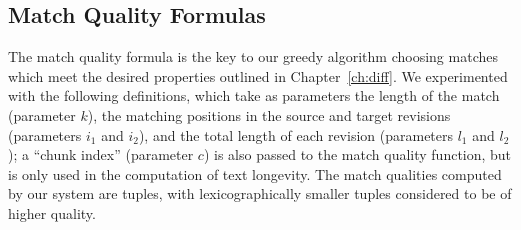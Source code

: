 \subsection{Match Quality Formulas}

The match quality formula is the key to our greedy algorithm
choosing matches which meet the desired properties outlined
in Chapter~\ref{ch:diff}.
We experimented with the following  definitions,
which take as parameters the length of the match (parameter $k$),
the matching positions in the source and target revisions
(parameters $i_1$ and $i_2$), and the total length of
each revision (parameters $l_1$ and $l_2$);
a ``chunk index'' (parameter $c$) is also passed to the
match quality function, but is only used in the computation
of text longevity.
The match qualities computed by our system are tuples,
with lexicographically smaller tuples considered to be
of higher quality.

